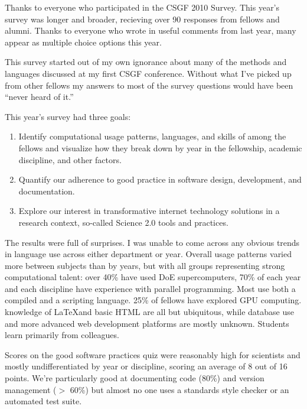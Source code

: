 \documentclass[a4paper]{article}
\begin{document}
Thanks to everyone who participated in the CSGF 2010 Survey.  This year's survey was longer and broader, recieving over 90 responses from fellows and alumni.  Thanks to everyone who wrote in useful comments from last year, many appear as multiple choice options this year.  

This survey started out of my own ignorance about many of the methods and languages discussed at my first CSGF conference.  Without what I've picked up from other fellows my answers to most of the survey questions would have been ``never heard of it.''  

This year's survey had three goals:

\begin{enumerate}
\item Identify computational usage patterns, languages, and skills of among the fellows and visualize how they break down by year in the fellowship, academic discipline, and other factors.  
\item Quantify our adherence to good practice in software design, development, and documentation.  
\item Explore our interest in transformative internet technology solutions in a research context, so-called Science 2.0 tools and practices.
\end{enumerate}


The results were full of surprises.  I was unable to come across any obvious trends in language use across either department or year.  Overall usage patterns varied more between subjects than by years, but with all groups representing strong computational talent: over 40\% have used DoE supercomputers, 70\% of each year and each discipline have experience with parallel programming.  Most use both a compiled and a scripting language. 25\% of fellows have explored GPU computing.  knowledge of \LaTeX and basic HTML are all but ubiquitous, while database use and more advanced web development platforms are mostly unknown.  Students learn primarily from colleagues.  

Scores on the good software practices quiz were reasonably high for scientists and mostly undifferentiated by year or discipline, scoring an average of 8 out of 16 points.  We're particularly good at documenting code (80\%) and version management ($>$ 60\%) but almost no one uses a standards style checker or an automated test suite.  
\end{document}
